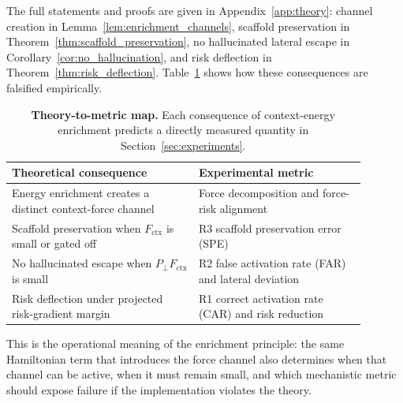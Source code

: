 The full statements and proofs are given in
Appendix~\ref{app:theory}: channel creation in
Lemma~\ref{lem:enrichment_channels}, scaffold preservation in
Theorem~\ref{thm:scaffold_preservation}, no hallucinated lateral escape
in Corollary~\ref{cor:no_hallucination}, and risk deflection in
Theorem~\ref{thm:risk_deflection}. Table~\ref{tab:method:theory_metrics}
shows how these consequences are falsified empirically.

\begin{table}[t]
\centering
\caption{\textbf{Theory-to-metric map.} Each consequence of
context-energy enrichment predicts a directly measured quantity in
Section~\ref{sec:experiments}.}
\label{tab:method:theory_metrics}
\begin{tabular}{p{0.47\linewidth}p{0.42\linewidth}}
\toprule
Theoretical consequence & Experimental metric \\
\midrule
Energy enrichment creates a distinct context-force channel
& Force decomposition and force-risk alignment \\
Scaffold preservation when \(F_{\mathrm{ctx}}\) is small or gated off
& R3 scaffold preservation error (SPE) \\
No hallucinated escape when \(P_\perp F_{\mathrm{ctx}}\) is small
& R2 false activation rate (FAR) and lateral deviation \\
Risk deflection under projected risk-gradient margin
& R1 correct activation rate (CAR) and risk reduction \\
\bottomrule
\end{tabular}
\end{table}

This is the operational meaning of the enrichment principle: the same
Hamiltonian term that introduces the force channel also determines when
that channel can be active, when it must remain small, and which
mechanistic metric should expose failure if the implementation violates
the theory.
